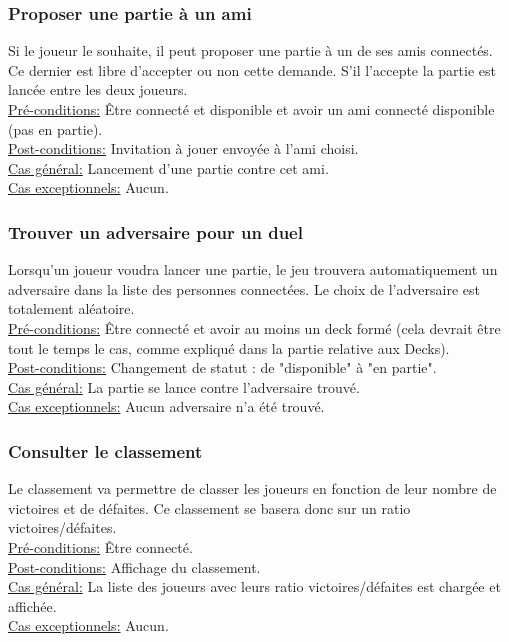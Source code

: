 \documentclass[11pt,a4paper]{article}
\begin{document}
\subsubsection*{Proposer une partie à un ami}

Si le joueur le souhaite, il peut proposer une partie à un de ses
amis connectés. Ce dernier est libre d'accepter ou non cette demande.
S'il l'accepte la partie est lancée entre les deux joueurs.\\
\underline{Pré-conditions:} 
 Être connecté et disponible et avoir un ami connecté disponible (pas en partie).\\
\underline{Post-conditions:} 
 Invitation à jouer envoyée à l'ami choisi.\\
\underline{Cas général:} 
 Lancement d'une partie contre cet ami.\\
\underline{Cas exceptionnels:} 
 Aucun.\\
 

\subsubsection*{Trouver un adversaire pour un duel}

Lorsqu'un joueur voudra lancer une partie, le jeu trouvera
automatiquement un adversaire dans la liste des personnes
connectées. Le choix de l'adversaire est totalement aléatoire.\\
\underline{Pré-conditions:} 
 Être connecté et avoir au moins un deck formé (cela devrait être tout le temps le cas, comme expliqué dans la partie relative aux Decks).\\
\underline{Post-conditions:} 
 Changement de statut : de "disponible" à "en partie".\\
\underline{Cas général:} 
 La partie se lance contre l'adversaire trouvé.\\
\underline{Cas exceptionnels:} 
 Aucun adversaire n'a été trouvé.\\

\subsubsection*{Consulter le classement}

Le classement va permettre de classer les joueurs en fonction de
leur nombre de victoires et de défaites. Ce classement se
basera donc sur un ratio victoires/défaites.\\
\underline{Pré-conditions:} 
 Être connecté.\\
\underline{Post-conditions:} 
 Affichage du classement.\\
\underline{Cas général:} 
 La liste des joueurs avec leurs ratio victoires/défaites est chargée et affichée.\\
\underline{Cas exceptionnels:} 
 Aucun.\\
\end{document}
